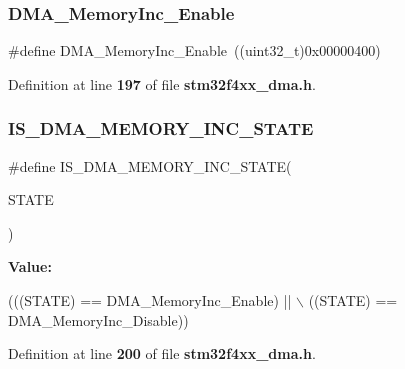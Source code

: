 \subsubsection{D\+M\+A\+\_\+\+Memory\+Inc\+\_\+\+Enable}
{\footnotesize\ttfamily \#define D\+M\+A\+\_\+\+Memory\+Inc\+\_\+\+Enable~((uint32\+\_\+t)0x00000400)}



Definition at line \textbf{ 197} of file \textbf{ stm32f4xx\+\_\+dma.\+h}.

\mbox{\label{group__DMA__memory__incremented__mode_gaa880f39d499d1e80449cf80381e4eb67}} 
\subsubsection{I\+S\+\_\+\+D\+M\+A\+\_\+\+M\+E\+M\+O\+R\+Y\+\_\+\+I\+N\+C\+\_\+\+S\+T\+A\+TE}
{\footnotesize\ttfamily \#define I\+S\+\_\+\+D\+M\+A\+\_\+\+M\+E\+M\+O\+R\+Y\+\_\+\+I\+N\+C\+\_\+\+S\+T\+A\+TE(\begin{DoxyParamCaption}\item[{}]{S\+T\+A\+TE }\end{DoxyParamCaption})}

{\bfseries Value\+:}
\begin{DoxyCode}
(((STATE) == DMA_MemoryInc_Enable) || \(\backslash\)
                                        ((STATE) == DMA_MemoryInc_Disable))
\end{DoxyCode}


Definition at line \textbf{ 200} of file \textbf{ stm32f4xx\+\_\+dma.\+h}.

